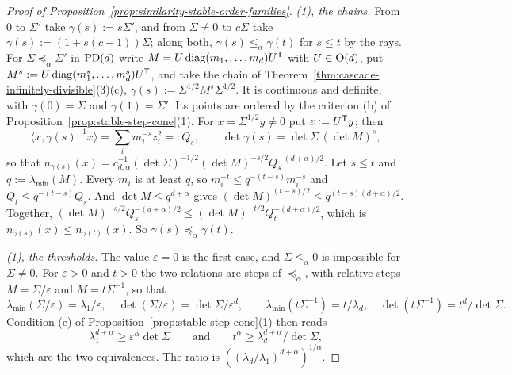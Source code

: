 \begin{proof}[Proof of Proposition~\ref{prop:similarity-stable-order-families}]
\emph{(1), the chains.} From $0$ to $\Sigma'$ take $\gamma(s) := s\Sigma'$, and from $\Sigma \ne 0$ to
$c\Sigma$ take $\gamma(s) := (1 + s(c-1))\Sigma$; along both, $\gamma(s) \le_\alpha \gamma(t)$ for $s \le t$
by the rays. For $\Sigma \preceq_\alpha \Sigma'$ in $\mathrm{PD}(d)$ write $M = U\operatorname{diag}(m_1, \dots, m_d)U^{\mathsf{T}}$ with
$U \in \mathrm{O}(d)$, put $M^s := U\operatorname{diag}(m_1^s, \dots, m_d^s)U^{\mathsf{T}}$, and take the chain of
Theorem~\ref{thm:cascade-infinitely-divisible}(3)(c), $\gamma(s) := \Sigma^{1/2}M^s\Sigma^{1/2}$. It is continuous and
definite, with $\gamma(0) = \Sigma$ and $\gamma(1) = \Sigma'$. Its points are ordered by the criterion (b) of
Proposition~\ref{prop:stable-step-cone}(1). For $x = \Sigma^{1/2}y \ne 0$ put $z := U^{\mathsf{T}}y$; then
\[
  \langle x, \gamma(s)^{-1}x\rangle = \sum_{i} m_i^{-s}z_i^2 =: Q_s , \qquad
  \det\gamma(s) = \det\Sigma\,(\det M)^s ,
\]
so that $n_{\gamma(s)}(x) = c_{d,\alpha}^{-1}(\det\Sigma)^{-1/2}(\det M)^{-s/2}Q_s^{-(d+\alpha)/2}$. Let
$s \le t$ and $q := \lambda_{\min}(M)$. Every $m_i$ is at least $q$, so $m_i^{-t} \le q^{-(t-s)}m_i^{-s}$ and
$Q_t \le q^{-(t-s)}Q_s$. And $\det M \le q^{d+\alpha}$ gives $(\det M)^{(t-s)/2} \le
q^{(t-s)(d+\alpha)/2}$. Together,
$(\det M)^{-s/2}Q_s^{-(d+\alpha)/2} \le (\det M)^{-t/2}Q_t^{-(d+\alpha)/2}$, which is
$n_{\gamma(s)}(x) \le n_{\gamma(t)}(x)$. So $\gamma(s) \preceq_\alpha \gamma(t)$.

\emph{(1), the thresholds.} The value $\varepsilon = 0$ is the first case, and $\Sigma \le_\alpha 0$ is
impossible for $\Sigma \ne 0$. For $\varepsilon > 0$ and $t > 0$ the two relations are steps of
$\preceq_\alpha$, with relative steps $M = \Sigma/\varepsilon$ and $M = t\Sigma^{-1}$, so that
\[
  \lambda_{\min}(\Sigma/\varepsilon) = \lambda_1/\varepsilon , \quad \det(\Sigma/\varepsilon) = \det\Sigma/\varepsilon^d ,
  \qquad
  \lambda_{\min}(t\Sigma^{-1}) = t/\lambda_d , \quad \det(t\Sigma^{-1}) = t^d/\det\Sigma .
\]
Condition (c) of Proposition~\ref{prop:stable-step-cone}(1) then reads
\[
  \lambda_1^{d+\alpha} \ge \varepsilon^\alpha\det\Sigma
  \qquad\text{and}\qquad
  t^\alpha \ge \lambda_d^{d+\alpha}/\det\Sigma ,
\]
which are the two equivalences. The ratio is $((\lambda_d/\lambda_1)^{d+\alpha})^{1/\alpha}$.


\end{proof}

